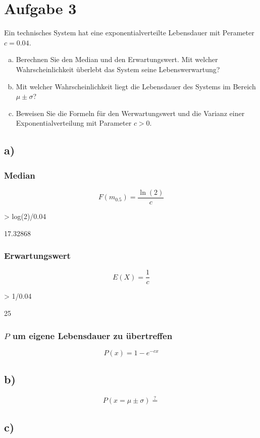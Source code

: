 \section{Aufgabe 3}
Ein technisches System hat eine exponentialverteilte Lebensdauer mit 
Perameter $c=0.04$.
\begin{enumerate}[(a)]
	\item Berechnen Sie den Median und den Erwartungswert. 
		Mit welcher Wahrscheinlichkeit überlebt das System seine
		Lebenswerwartung?
	\item Mit welcher Wahrscheinlichkeit liegt die Lebensdauer des 
		Systems im Bereich $\mu \pm \sigma$? 
	\item Beweisen Sie die Formeln für den Werwartungswert und die
		Varianz einer Exponentialverteilung mit Parameter $c > 0$.
\end{enumerate}

\subsection*{a)}
\subsubsection*{Median}
\[ F(m_{0.5}) = \frac{\ln(2)}{c} \]
\begin{Schunk}
\begin{Sinput}
> log(2)/0.04
\end{Sinput}
\begin{Soutput}
[1] 17.32868
\end{Soutput}
\end{Schunk}
\subsubsection*{Erwartungswert}
\[ E(X) = \frac{1}{c} \]
\begin{Schunk}
\begin{Sinput}
> 1/0.04
\end{Sinput}
\begin{Soutput}
[1] 25
\end{Soutput}
\end{Schunk}
\subsubsection*{$P$ um eigene Lebensdauer zu übertreffen}
\[ P(x) = 1 - e^{-cx}  \]

\subsection*{b)}
\[ P(x = \mu \pm \sigma) \stackrel{?}{=} \]

\subsection*{c)}
